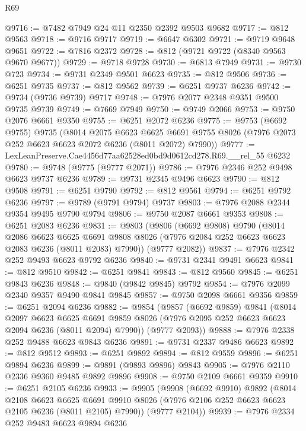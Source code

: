\begin{lexlean}{R69}
\begin{coremodule}
{@9716 := @7482 @7949 @24 @11 @2350 @2392 @9503 @9682
@9717 := @812 @9563
@9718 := @9716 @9717
@9719 := @6647 @6302
@9721 := @9719 @9648 @9651
@9722 := @7816 @2372
@9728 := @812 (@9721 @9722 (@8340 @9563 @9670 @9677))
@9729 := @9718 @9728
@9730 := @6813 @7949
@9731 := @9730 @723
@9734 := @9731 @2349 @9501 @6623
@9735 := @812 @9506
@9736 := @6251 @9735
@9737 := @812 @9562
@9739 := @6251 @9737 @6236
@9742 := @9734 (@9736 @9739) @9717
@9748 := @7976 @2077 @2348 @9351 @9500 @9735 @9739
@9749 := @7669 @7949
@9750 := @9749 @2066
@9753 := @9750 @2076 @6661 @9350
@9755 := @6251 @2072 @6236
@9775 := @9753
    (@6692 @9755)
    @9735
    (@8014
      @2075
      @6623
      @6625
      @6691
      @9755
      @8026
      (@7976 @2073 @252 @6623 @6623 @2072 @6236 (@8011 @2072) @7990))
@9777 := LexLeanPreserve.Cae4456d77aa62528ed0bd9d0612cd278.R69.__rel_55 @6232
@9780 := @9748 (@9775 (@9777 @2071))
@9786 := @7976 @2346 @252 @9498 @6623 @9737 @6236
@9789 := @9731 @2345 @9496 @6623
@9790 := @812 @9508
@9791 := @6251 @9790
@9792 := @812 @9561
@9794 := @6251 @9792 @6236
@9797 := @9789 (@9791 @9794) @9737
@9803 := @7976 @2088 @2344 @9354 @9495 @9790 @9794
@9806 := @9750 @2087 @6661 @9353
@9808 := @6251 @2083 @6236
@9831 := @9803
    (@9806
      (@6692 @9808)
      @9790
      (@8014
        @2086
        @6623
        @6625
        @6691
        @9808
        @8026
        (@7976 @2084 @252 @6623 @6623 @2083 @6236 (@8011 @2083) @7990))
      (@9777 @2082))
@9837 := @7976 @2342 @252 @9493 @6623 @9792 @6236
@9840 := @9731 @2341 @9491 @6623
@9841 := @812 @9510
@9842 := @6251 @9841
@9843 := @812 @9560
@9845 := @6251 @9843 @6236
@9848 := @9840 (@9842 @9845) @9792
@9854 := @7976 @2099 @2340 @9357 @9490 @9841 @9845
@9857 := @9750 @2098 @6661 @9356
@9859 := @6251 @2094 @6236
@9882 := @9854
    (@9857
      (@6692 @9859)
      @9841
      (@8014
        @2097
        @6623
        @6625
        @6691
        @9859
        @8026
        (@7976 @2095 @252 @6623 @6623 @2094 @6236 (@8011 @2094) @7990))
      (@9777 @2093))
@9888 := @7976 @2338 @252 @9488 @6623 @9843 @6236
@9891 := @9731 @2337 @9486 @6623
@9892 := @812 @9512
@9893 := @6251 @9892
@9894 := @812 @9559
@9896 := @6251 @9894 @6236
@9899 := @9891 (@9893 @9896) @9843
@9905 := @7976 @2110 @2336 @9360 @9485 @9892 @9896
@9908 := @9750 @2109 @6661 @9359
@9910 := @6251 @2105 @6236
@9933 := @9905
    (@9908
      (@6692 @9910)
      @9892
      (@8014
        @2108
        @6623
        @6625
        @6691
        @9910
        @8026
        (@7976 @2106 @252 @6623 @6623 @2105 @6236 (@8011 @2105) @7990))
      (@9777 @2104))
@9939 := @7976 @2334 @252 @9483 @6623 @9894 @6236
}
\end{coremodule}
\end{lexlean}
